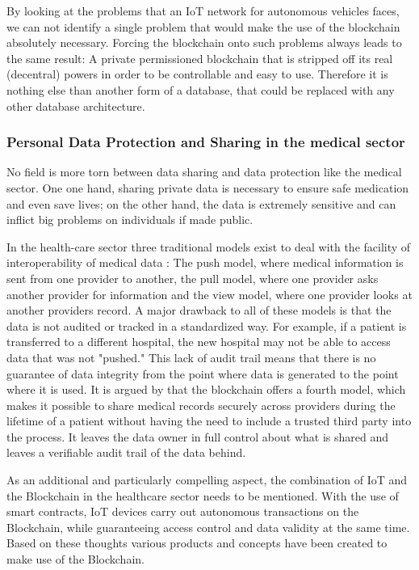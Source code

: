By looking at the problems that an IoT network for autonomous vehicles faces, we can not identify a single problem that would make the use of the blockchain absolutely necessary. Forcing the blockchain onto such problems always leads to the same result: A private permissioned blockchain that is stripped off its real (decentral) powers in order to be controllable and easy to use. Therefore it is nothing else than another form of a database, that could be replaced with any other database architecture.

\subsubsection{Personal Data Protection and Sharing in the medical sector}
No field is more torn between data sharing and data protection like the medical sector. One one hand, sharing private data is necessary to ensure safe medication and even save lives; on the other hand, the data is extremely sensitive and can inflict big problems on individuals if made public.

In the health-care sector three traditional models exist to deal with the facility of interoperability of medical data \cite{Kshetri2017}: The push model, where medical information is sent from one provider to another, the pull model, where one provider asks another provider for information and the view model, where one provider looks at another providers record.
A major drawback to all of these models is that the data is not audited or tracked in a standardized way. For example, if a patient is transferred to a different hospital, the new hospital may not be able to access data that was not "pushed." This lack of audit trail means that there is no guarantee of data integrity from the point where data is generated to the point where it is used.
It is argued by \citeauthor{Kshetri2017} that the blockchain offers a fourth model, which makes it possible to share medical records securely across providers during the lifetime of a patient without having the need to include a trusted third party into the process. It leaves the data owner in full control about what is shared and leaves a verifiable audit trail of the data behind. \cite{Kshetri2017}

As an additional and particularly compelling aspect, the combination of IoT and the Blockchain in the healthcare sector needs to be mentioned. With the use of smart contracts, IoT devices carry out autonomous transactions on the Blockchain, while guaranteeing access control and data validity at the same time. Based on these thoughts various products and concepts have been created to make use of the Blockchain.

